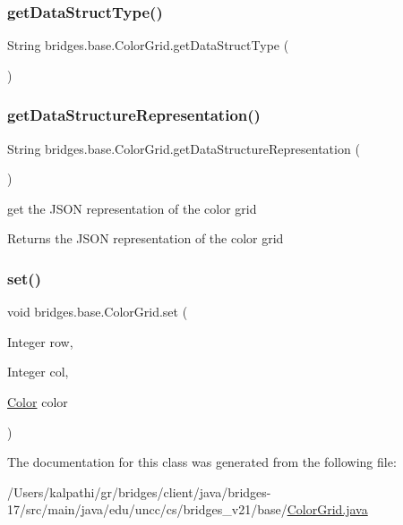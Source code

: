 \subsubsection{\texorpdfstring{get\+Data\+Struct\+Type()}{getDataStructType()}}
{\footnotesize\ttfamily String bridges.\+base.\+Color\+Grid.\+get\+Data\+Struct\+Type (\begin{DoxyParamCaption}{ }\end{DoxyParamCaption})}

\mbox{\label{classbridges_1_1base_1_1_color_grid_a81ca0995d17b6cb31122b718dfa57286}} 
\subsubsection{\texorpdfstring{get\+Data\+Structure\+Representation()}{getDataStructureRepresentation()}}
{\footnotesize\ttfamily String bridges.\+base.\+Color\+Grid.\+get\+Data\+Structure\+Representation (\begin{DoxyParamCaption}{ }\end{DoxyParamCaption})}

get the J\+S\+ON representation of the color grid

\begin{DoxyReturn}{Returns}
the J\+S\+ON representation of the color grid 
\end{DoxyReturn}
\mbox{\label{classbridges_1_1base_1_1_color_grid_a93b29af9bb21b2bf6e52bc3fda9ff34a}} 
\subsubsection{\texorpdfstring{set()}{set()}}
{\footnotesize\ttfamily void bridges.\+base.\+Color\+Grid.\+set (\begin{DoxyParamCaption}\item[{Integer}]{row,  }\item[{Integer}]{col,  }\item[{\mbox{\hyperlink{classbridges_1_1base_1_1_color}{Color}}}]{color }\end{DoxyParamCaption})}



The documentation for this class was generated from the following file\+:\begin{DoxyCompactItemize}
\item 
/\+Users/kalpathi/gr/bridges/client/java/bridges-\/17/src/main/java/edu/uncc/cs/bridges\+\_\+v21/base/\mbox{\hyperlink{_color_grid_8java}{Color\+Grid.\+java}}\end{DoxyCompactItemize}
